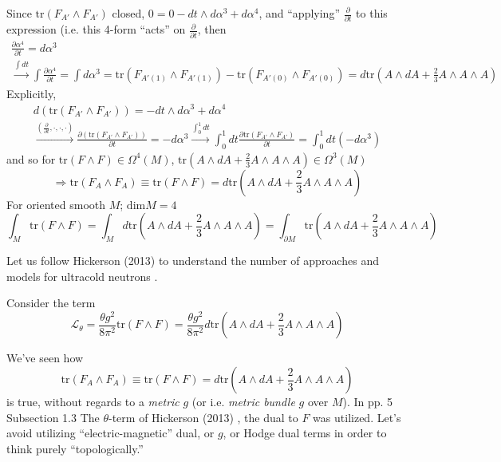 \documentclass[10pt]{amsart}
\begin{document}
\begin{multicols}{2}
Since $\text{tr}(F_{A'} \wedge F_{A'})$ closed, $0 = 0 - dt \wedge d\alpha^3 + d\alpha^4$, and ``applying'' $\frac{ \partial }{ \partial t}$ to this expression (i.e. this 4-form ``acts'' on $\frac{ \partial }{ \partial t}$, then 
\[
\begin{gathered}
  \frac{ \partial \alpha^4}{ \partial t} = d\alpha^3 \\ 
\xrightarrow{ \int dt } \int \frac{ \partial \alpha^4}{ \partial t} = \int d\alpha^3 = \text{tr}(F_{A'(1)} \wedge F_{A'(1)} ) - \text{tr}(F_{A'(0)} \wedge F_{A'(0) } ) = d\text{tr}(A\wedge dA + \frac{2}{3} A \wedge A \wedge A)
\end{gathered}
\]
Explicitly,
\[
\begin{gathered}
  d(\text{tr}(F_{A'} \wedge F_{A'}) ) = -dt \wedge d\alpha^3 + d\alpha^4 \\ 
  \xrightarrow{ \left( \frac{ \partial }{ \partial t} , \cdot, \cdot, \cdot \right) } \frac{ \partial ( \text{tr}(F_{A'} \wedge F_{A'} ) ) }{ \partial t} = - d\alpha^3 \xrightarrow{ \int_0^1 dt } \int_0^1 dt \frac{ \partial \text{tr}( F_{A'} \wedge F_{A'})}{ \partial t} = \int_0^1 dt ( -d\alpha^3)
\end{gathered}
\]
and so for $\text{tr}(F\wedge F) \in \Omega^4(M)$, $\text{tr}(A \wedge dA + \frac{2}{3} A \wedge A \wedge A) \in \Omega^3(M)$
\[
\Longrightarrow \text{tr}(F_A \wedge F_A) \equiv \text{tr}(F\wedge F) = d\text{tr}(A \wedge dA + \frac{2}{3} A \wedge A \wedge A )
\]
For oriented smooth $M$; $\text{dim}M=4$
\[
\int_M \text{tr}(F\wedge F)= \int_M d\text{tr}(A \wedge dA + \frac{2}{3} A \wedge A \wedge A ) = \int_{\partial M} \text{tr}(A \wedge dA + \frac{2}{3} A \wedge A \wedge A)
\]




Let us follow Hickerson (2013) \cite{Hick2013} to understand the number of approaches and models for ultracold neutrons \cite{Hick2013}.  

Consider the term
\[
\mathcal{L}_{\theta} = \frac{ \theta g^2}{ 8 \pi^2 } \text{tr}(F\wedge F) = \frac{ \theta g^2}{8 \pi^2} d\text{tr}( A \wedge dA + \frac{2}{3} A \wedge A \wedge A)
\]

We've seen how 
\begin{equation}
  \text{tr}(F_A \wedge F_A) \equiv \text{tr}(F\wedge F) = d\text{tr}(A \wedge dA + \frac{2}{3} A \wedge A \wedge A )
\end{equation}
is true, without regards to a \emph{metric} $g$ (or i.e. \emph{metric bundle} $g$ over $M$).  In pp. 5 Subsection 1.3 The $\theta$-term of Hickerson (2013) \cite{Hick2013}, the dual to $F$ was utilized.  Let's avoid utilizing ``electric-magnetic'' dual, or $g$, or Hodge dual terms in order to think purely ``topologically.''



\end{multicols}
\end{document}
